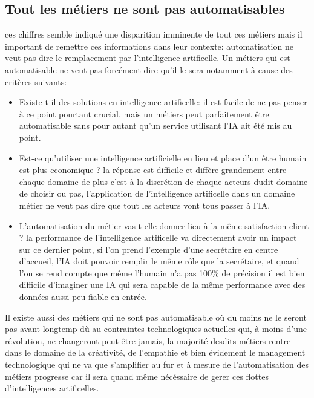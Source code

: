     \subsection*{Tout les métiers ne sont pas automatisables}
        ces chiffres semble indiqué une disparition imminente de tout ces métiers mais il important 
        de remettre ces informations dans leur contexte: automatisation ne veut pas dire le remplacement 
        par l'intelligence artificelle. Un métiers qui est automatisable ne veut pas forcément dire 
        qu'il le sera notamment à cause des critères suivants: \newline
        \begin{itemize}
            \item Existe-t-il des solutions en intelligence artificelle: il est facile de ne pas penser 
            à ce point pourtant crucial, mais un métiers peut parfaitement être automatisable sans 
            pour autant qu'un service utilisant l'IA ait été mis au point. 
            \newline

            \item Est-ce qu'utiliser une intelligence artificielle en lieu et place d'un être humain 
            est plus economique ? la réponse est difficile et diffère grandement entre chaque domaine 
            de plus c'est à la discrétion de chaque acteurs dudit domaine de choisir ou pas, 
            l'application de l'intelligence artificelle dans un domaine métier ne veut pas dire 
            que tout les acteurs vont tous passer à l'IA. 
            \newline

            \item L'automatisation du métier vas-t-elle donner lieu à la même satisfaction client ? 
            la performance de l'intelligence artificelle va directement avoir un impact sur ce dernier 
            point, si l'on prend l'exemple d'une secrétaire en centre d'accueil, l'IA 
            doit pouvoir remplir le même rôle que la secrétaire, et quand l'on se rend compte 
            que même l'humain n'a pas 100\% de précision il est bien difficile d'imaginer 
            une IA qui sera capable de la même performance avec des données aussi peu fiable 
            en entrée.
            \newline
        \end{itemize}

        Il existe aussi des métiers qui ne sont pas automatisable où du moins ne le seront pas avant 
        longtemp dù au contraintes technologiques actuelles qui, à moins d'une révolution, 
        ne changeront peut être jamais, la majorité desdits métiers rentre dans le domaine de la créativité,
        de l'empathie et bien évidement le management technologique qui ne va que s'amplifier 
        au fur et à mesure de l'automatisation des métiers progresse car il sera quand même nécéssaire 
        de gerer ces flottes d'intelligences artificelles. 

